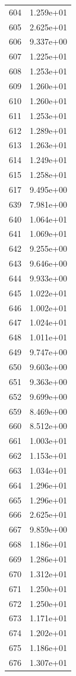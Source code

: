 \documentclass[12pt]{article}
\begin{document}
\begin{longtable}{@{}cc@{}}
604 & 1.259e+01 \\
605 & 2.625e+01 \\
606 & 9.337e+00 \\
607 & 1.225e+01 \\
608 & 1.253e+01 \\
609 & 1.260e+01 \\
610 & 1.260e+01 \\
611 & 1.253e+01 \\
612 & 1.289e+01 \\
613 & 1.263e+01 \\
614 & 1.249e+01 \\
615 & 1.258e+01 \\
617 & 9.495e+00 \\
639 & 7.981e+00 \\
640 & 1.064e+01 \\
641 & 1.069e+01 \\
642 & 9.255e+00 \\
643 & 9.646e+00 \\
644 & 9.933e+00 \\
645 & 1.022e+01 \\
646 & 1.002e+01 \\
647 & 1.024e+01 \\
648 & 1.011e+01 \\
649 & 9.747e+00 \\
650 & 9.603e+00 \\
651 & 9.363e+00 \\
652 & 9.699e+00 \\
659 & 8.469e+00 \\
660 & 8.512e+00 \\
661 & 1.003e+01 \\
662 & 1.153e+01 \\
663 & 1.034e+01 \\
664 & 1.296e+01 \\
665 & 1.296e+01 \\
666 & 2.625e+01 \\
667 & 9.859e+00 \\
668 & 1.186e+01 \\
669 & 1.286e+01 \\
670 & 1.312e+01 \\
671 & 1.250e+01 \\
672 & 1.250e+01 \\
673 & 1.171e+01 \\
674 & 1.202e+01 \\
675 & 1.186e+01 \\
676 & 1.307e+01 \\

\end{longtable}
\end{document}
